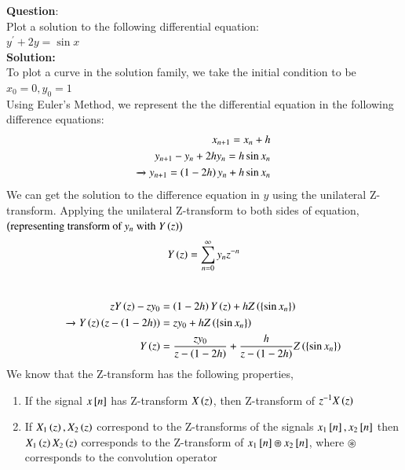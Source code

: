 \documentclass[journal]{IEEEtran}
\begin{document}
\textbf{Question}:\\
Plot a solution to the following differential equation:\\
    $y^\prime + 2y = \sin x$
\\
\textbf{Solution: }\\
To plot a curve in the solution family, we take the initial condition to be\\
$x_0 = 0, y_0 = 1$\\
Using Euler's Method, we represent the the differential equation in the following difference equations:
\begin{align}
    x_{n+1} = x_n + h\\
    y_{n+1} - y_n + 2hy_n  = h\sin x_n\\
    \xrightarrow{} y_{n+1} = \left(1-2h\right)y_n + h\sin x_n
\end{align}
We can get the solution to the difference equation in $y$ using the unilateral Z-transform.
Applying the unilateral Z-transform to both sides of equation,$\left(\text{representing transform of $y_n$ with $Y\left(z\right)$}\right)$ 
\begin{align}
    Y\left(z\right) = \sum_{n=0}^{\infty}y_nz^{-n}\\
\end{align}
    \\
\begin{align}
    zY\left(z\right) - zy_0 &= \left(1-2h\right)Y\left(z\right) + hZ\left(\left\{\sin x_n\right\}\right)\\
    \xrightarrow{} Y\left(z\right)\left(z - \left(1-2h\right)\right) &= zy_0 + hZ\left(\left\{\sin x_n\right\}\right)\\
    Y\left(z\right) &= \frac{zy_0}{z-\left(1-2h\right)} + \frac{h}{z-\left(1-2h\right)}Z\left(\left\{\sin x_n\right\}\right)
\end{align}
    We know that the Z-transform has the following properties,\\
    \begin{enumerate}
        \item If the signal $x{}\left[n\right]$ has Z-transform $X\left(z\right)$, then Z-transform of $z^{-1}X\left(z\right)$
        \item If $X_1\left(z\right), X_2\left(z\right)$ correspond to the Z-transforms of the signals $x_1{}\left[n\right], x_2{}\left[n\right]$
            then $X_1\left(z\right)X_2\left(z\right)$ corresponds to the Z-transform of $x_1{}\left[n\right] \circledast x_2{}\left[n\right]$, where 
            $\circledast$ corresponds to the convolution operator
    \end{enumerate}
    
\end{document}
